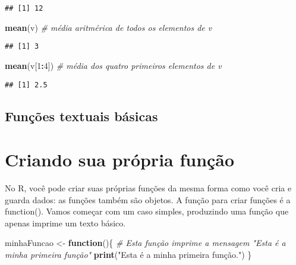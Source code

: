 \documentclass[
]{book}
\newenvironment{Shaded}{\begin{snugshade}}{\end{snugshade}}
\newcommand{\CommentTok}[1]{\textcolor[rgb]{0.56,0.35,0.01}{\textit{#1}}}
\newcommand{\ControlFlowTok}[1]{\textcolor[rgb]{0.13,0.29,0.53}{\textbf{#1}}}
\newcommand{\DecValTok}[1]{\textcolor[rgb]{0.00,0.00,0.81}{#1}}
\newcommand{\KeywordTok}[1]{\textcolor[rgb]{0.13,0.29,0.53}{\textbf{#1}}}
\newcommand{\NormalTok}[1]{#1}
\newcommand{\OperatorTok}[1]{\textcolor[rgb]{0.81,0.36,0.00}{\textbf{#1}}}
\newcommand{\StringTok}[1]{\textcolor[rgb]{0.31,0.60,0.02}{#1}}
\begin{document}
\begin{verbatim}
## [1] 12
\end{verbatim}

\begin{Shaded}
\begin{Highlighting}[]
\KeywordTok{mean}\NormalTok{(v) }\CommentTok{# média aritmérica de todos os elementos de v}
\end{Highlighting}
\end{Shaded}

\begin{verbatim}
## [1] 3
\end{verbatim}

\begin{Shaded}
\begin{Highlighting}[]
\KeywordTok{mean}\NormalTok{(v[}\DecValTok{1}\OperatorTok{:}\DecValTok{4}\NormalTok{]) }\CommentTok{# média dos quatro primeiros elementos de v}
\end{Highlighting}
\end{Shaded}

\begin{verbatim}
## [1] 2.5
\end{verbatim}

\hypertarget{funuxe7uxf5es-textuais-buxe1sicas-1}{%
\section{Funções textuais básicas}\label{funuxe7uxf5es-textuais-buxe1sicas-1}}

\hypertarget{criando-sua-pruxf3pria-funuxe7uxe3o}{%
\chapter{Criando sua própria função}\label{criando-sua-pruxf3pria-funuxe7uxe3o}}

No R, você pode criar suas próprias funções da mesma forma como você cria e guarda dados: as funções também são objetos. A função para criar funções é a function(). Vamos começar com um caso simples, produzindo uma função que apenas imprime um texto básico.

\begin{Shaded}
\begin{Highlighting}[]
\NormalTok{minhaFuncao <-}\StringTok{ }\ControlFlowTok{function}\NormalTok{()\{}
  \CommentTok{# Esta função imprime a mensagem "Esta é a minha primeira função"}
  \KeywordTok{print}\NormalTok{(}\StringTok{"Esta é a minha primeira função."}\NormalTok{)}
\NormalTok{\}}
\end{Highlighting}
\end{Shaded}
\end{document}
